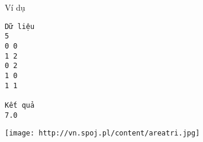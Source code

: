 Ví dụ
\begin{verbatim}
Dữ liệu
5
0 0
1 2
0 2
1 0
1 1

Kết quả
7.0
\end{verbatim}
\texttt{[image: http://vn.spoj.pl/content/areatri.jpg]}